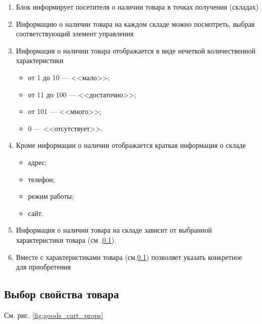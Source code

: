                         
            \begin{enumerate}
                \item Блок информирует посетителя о наличии товара в точках 
                получения (складах)
                \item Информацию о наличии товара на каждом складе можно 
                посмотреть, выбрав соответствующий элемент управления
                \item Информация о наличии товара отображается в виде 
                нечеткой количественной характеристики 
                    \begin{itemize}
                        \item от 1 до 10 --- <<мало>>;
                        \item от 11 до 100 --- <<достаточно>>;
                        \item от 101  --- <<много>>;
                        \item 0  --- <<отсутствует>>.
                    \end{itemize}
                \item Кроме информации о наличии отображается краткая 
                информация о складе
                    \begin{itemize}
                        \item адрес;
                        \item телефон;
                        \item режим работы;
                        \item сайт.
                    \end{itemize}
                \item Информация о наличии товара на складе зависит от 
                выбранной характеристики товара
                    (см .\ref{sec:goods_cart_props}). 
                \item Вместе с характеристиками товара 
                (см.\ref{sec:goods_cart_props}) позволяет указать конкретное 
                    \\
                    для приобретения
            \end{enumerate}
            
        \subsection{Выбор свойства товара}
            \label{sec:goods_cart_props}
            См. рис. \ref{fig:goods_cart_props}

